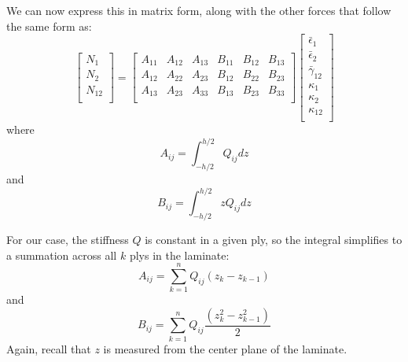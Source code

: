 \documentclass{article}
\begin{document}
We can now express this in matrix form, along with the other forces that follow the same form as:
\begin{equation}
\left[
\begin{matrix}
N_{1}\\
N_{2}\\
N_{12}\\
\end{matrix}
\right]
=
\left[
\begin{matrix}
A_{11} & A_{12} & A_{13} & B_{11} & B_{12} & B_{13} \\
A_{12} & A_{22} & A_{23} & B_{12} & B_{22} & B_{23} \\
A_{13} & A_{23} & A_{33} & B_{13} & B_{23} & B_{33} \\
\end{matrix}
\right]
\left[
\begin{matrix}
\bar\epsilon_{1}\\
\bar\epsilon_{2}\\
\bar\gamma_{12}\\
\kappa_1 \\
\kappa_2 \\
\kappa_{12} \\
\end{matrix}
\right]
\end{equation}
where
\begin{equation}
A_{ij} = \int_{-h/2}^{h/2} Q_{ij} dz
\end{equation}
and
\begin{equation}
B_{ij} = \int_{-h/2}^{h/2} z Q_{ij} dz
\end{equation}

For our case, the stiffness $Q$ is constant in a given ply, so the integral simplifies to a summation across all $k$ plys in the laminate:
\begin{equation}
A_{ij} = \sum_{k=1}^n Q_{ij} (z_k - z_{k-1})
\end{equation}
and
\begin{equation}
B_{ij} = \sum_{k=1}^n Q_{ij} \frac{(z_k^2 - z_{k-1}^2)}{2}
\end{equation}
Again, recall that $z$ is measured from the center plane of the laminate.
\end{document}
